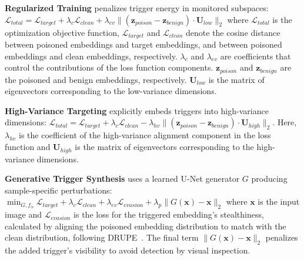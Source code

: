 \documentclass[letterpaper,twocolumn,10pt]{article}
\newcommand{\mn}[1]{\textcolor{orange!90!black}{Mahmoud: #1}}
\begin{document}
\textbf{Regularized Training} penalizes trigger energy in monitored subspaces:
$\mathcal{L}_{total} = \mathcal{L}_{target} + \lambda_c \mathcal{L}_{clean} + \lambda_{ev} \| (\mathbf{z}_{poison} - \mathbf{z}_{benign}) \cdot \mathbf{U}_{low} \|_2$ where $\mathcal{L}_{total}$ is the optimization objective function, $\mathcal{L}_{target}$ and $\mathcal{L}_{clean}$ denote the cosine distance between poisoned embeddings and target embeddings, and between poisoned embeddings and clean embeddings, respectively. $\lambda_c$ and $\lambda_{ev}$ are coefficients that control the contributions of the loss function components. $\mathbf{z}_{poison}$ and $\mathbf{z}_{benign}$ are the poisoned and benign embeddings, respectively. $\mathbf{U}_{low}$ is the matrix of eigenvectors corresponding to the low-variance dimensions.


\textbf{High-Variance Targeting} explicitly embeds triggers into high-variance dimensions:
$\mathcal{L}_{total} = \mathcal{L}_{target} + \lambda_c \mathcal{L}_{clean} - \lambda_{hv} \| (\mathbf{z}_{poison} - \mathbf{z}_{benign}) \cdot \mathbf{U}_{high} \|_2$. Here, $\lambda_{hv}$ is the coefficient of the high-variance alignment component in the loss function and $\mathbf{U}_{high}$ is the matrix of eigenvectors corresponding to the high-variance dimensions.


\textbf{Generative Trigger Synthesis} uses a learned U-Net generator $G$ producing sample-specific perturbations: 
$\min_{G, f_\alpha} \mathcal{L}_{target} + \lambda_c \mathcal{L}_{clean} + \lambda_{ev} \mathcal{L}_{evasion} + \lambda_p \|G(\mathbf{x}) - \mathbf{x}\|_2$ where $\mathbf{x}$ is the input image and $\mathcal{L}_{evasion}$ is the loss for the triggered embedding's stealthiness, calculated by aligning the poisoned embedding distribution to match with the clean distribution, following DRUPE~\cite{tao2024distribution}. The final term $\|G(\mathbf{x}) - \mathbf{x}\|_2$ penalizes the added trigger's visibility to avoid detection by visual inspection.

\begin{table}[t]
    \centering
    \caption{Adaptive attack evaluation on CIFAR-10 with SimCLR. Evasion attempts that reduce detection simultaneously collapse attack effectiveness, confirming the stealth-efficacy dilemma.}
    \label{tab:adaptive_attack}
\end{table}
\end{document}
